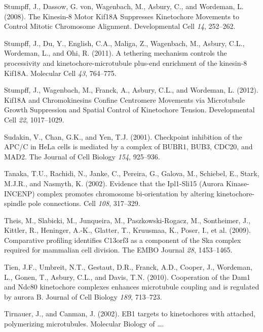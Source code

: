 \documentclass[12pt,a4paper,twoside,openright]{book}
\begin{document}
Stumpff, J., Dassow, G. von, Wagenbach, M., Asbury, C., and Wordeman, L.
(2008). The Kinesin-8 Motor Kif18A Suppresses Kinetochore Movements to
Control Mitotic Chromosome Alignment. Developmental Cell \emph{14},
252--262.

Stumpff, J., Du, Y., English, C.A., Maliga, Z., Wagenbach, M., Asbury,
C.L., Wordeman, L., and Ohi, R. (2011). A tethering mechanism controls
the processivity and kinetochore-microtubule plus-end enrichment of the
kinesin-8 Kif18A. Molecular Cell \emph{43}, 764--775.

Stumpff, J., Wagenbach, M., Franck, A., Asbury, C.L., and Wordeman, L.
(2012). Kif18A and Chromokinesins Confine Centromere Movements via
Microtubule Growth Suppression and Spatial Control of Kinetochore
Tension. Developmental Cell \emph{22}, 1017--1029.

Sudakin, V., Chan, G.K., and Yen, T.J. (2001). Checkpoint inhibition of
the APC/C in HeLa cells is mediated by a complex of BUBR1, BUB3, CDC20,
and MAD2. The Journal of Cell Biology \emph{154}, 925--936.

Tanaka, T.U., Rachidi, N., Janke, C., Pereira, G., Galova, M., Schiebel,
E., Stark, M.J.R., and Nasmyth, K. (2002). Evidence that the Ipl1-Sli15
(Aurora Kinase-INCENP) complex promotes chromosome bi-orientation by
altering kinetochore-spindle pole connections. Cell \emph{108},
317--329.

Theis, M., Slabicki, M., Junqueira, M., Paszkowski-Rogacz, M.,
Sontheimer, J., Kittler, R., Heninger, A.-K., Glatter, T., Kruusmaa, K.,
Poser, I., et al. (2009). Comparative profiling identifies C13orf3 as a
component of the Ska complex required for mammalian cell division. The
EMBO Journal \emph{28}, 1453--1465.

Tien, J.F., Umbreit, N.T., Gestaut, D.R., Franck, A.D., Cooper, J.,
Wordeman, L., Gonen, T., Asbury, C.L., and Davis, T.N. (2010).
Cooperation of the Dam1 and Ndc80 kinetochore complexes enhances
microtubule coupling and is regulated by aurora B. Journal of Cell
Biology \emph{189}, 713--723.

Tirnauer, J., and Canman, J. (2002). EB1 targets to kinetochores with
attached, polymerizing microtubules. Molecular Biology of \ldots{}.
\end{document}

